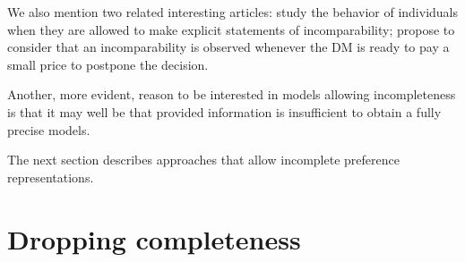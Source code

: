 \documentclass[version=last, pagesize, twocolumn, twoside=off, bibliography=totoc, 12pt, a4paper, english]{scrartcl}
\begin{document}
	
We also mention two related interesting articles: 
\citet{deparis_when_2012} study the behavior of individuals when they are allowed to make explicit statements of incomparability; \citet{danan_are_2006} propose to consider that an incomparability is observed whenever the \ac{DM} is ready to pay a small price to postpone the decision.

Another, more evident, reason to be interested in models allowing incompleteness is that it may well be that provided information is insufficient to obtain a fully precise models.
	
The next section describes approaches that allow incomplete preference representations.

\section{Dropping completeness}\label{sec:incomp}
\end{document}
